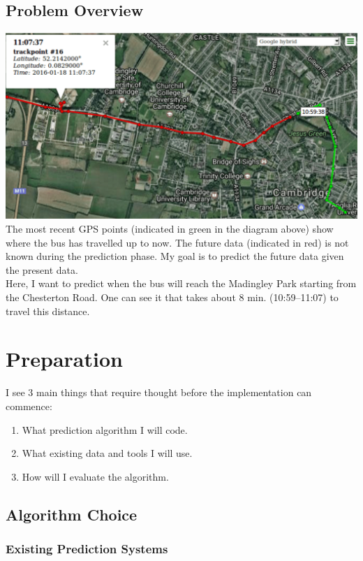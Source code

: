\documentclass[12pt,a4paper,oneside,openright]{report}
\begin{document}
\section{Problem Overview}

\includegraphics[width=\textwidth]{figs/problem_overview.png} \\

The most recent GPS points (indicated in green in the diagram above) show
where the bus has travelled up to now. The future data (indicated in red)
is not known during the prediction phase. My goal is to predict the future
data given the present data. \\

Here, I want to predict when the bus will reach the Madingley Park starting from the
Chesterton Road. One can see it that takes about 8 min. (10:59--11:07) to travel this distance.

\chapter{Preparation}

I see 3 main things that require thought before the implementation can commence:

\begin{enumerate}
\item What prediction algorithm I will code.
\item What existing data and tools I will use.
\item How will I evaluate the algorithm.
\end{enumerate}

\section{Algorithm Choice}

\subsection{Existing Prediction Systems}
\end{document}
